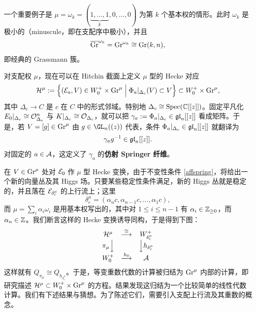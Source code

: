 一个重要例子是 $\mu=\omega_k=(\underbrace{1,\dots,1}_k,0,\dots,0)$ 为第 $k$ 个基本权的情形。此时 $\omega_k$ 是极小的（minuscule，即在支配序中极小），并且
\[
\overline{\textnormal{Gr}}^{\omega_k}=\textnormal{Gr}^{\omega_k}\cong \textnormal{Gr}(k,n),
\]
即经典的 Grassmann 簇。

对支配权 $\mu$，现在可以在 Hitchin 截面上定义 $\mu$ 型的 Hecke 对应
\begin{equation}\label{general}
\mathcal{H}^\mu:=\left\{ ({\mathcal E}_a,V)\in W^+_0\times \textnormal{Gr}^\mu \;\Big|\;  \Phi_a|_{\Delta_c}(V)\subset V\right\}\subset W^+_0\times  \textnormal{Gr}^\mu,
\end{equation}
其中 $\Delta_c\to C$ 是 $c$ 在 $C$ 中的形式邻域。特别地 $\Delta_c\cong \operatorname{Spec}(\mathbb{C}[[z]])$。固定平凡化 $E_0|_{\Delta_c}\cong {\mathcal O}^n_{\Delta_c}$ 与 $K|_{\Delta_c}\cong {\mathcal O}_{\Delta_c}$，就可以把 $\gamma_a:=\Phi_a|_{\Delta_c}\in {\mathfrak g\mathfrak l}_n[[z]]$ 看成矩阵。于是，若 $V=[g]\in \textnormal{Gr}^\mu$ 由 $g\in \GL_n((z))$ 代表，条件 $\Phi_a|_{\Delta_c}\in {\mathfrak g\mathfrak l}_n[[z]]$ 就翻译为
\begin{equation}\label{affspring}
\gamma_a g^{-1}\in {\mathfrak g\mathfrak l}_n[[z]].
\end{equation}
对固定的 $a\in {\mathcal{A}}$，这定义了 $\gamma_a$ 的\textbf{仿射 Springer 纤维}。

在 $V\in \textnormal{Gr}^\mu$ 处对 ${\mathcal E}_0$ 作 $\mu$ 型 Hecke 变换，由于不变性条件 \eqref{affspring}，将给出一个新的向量丛及其 Higgs 场。只要某些稳定性条件满足，新的 Higgs 丛就是稳定的，并且落在 ${\mathcal E}_{\delta^\mu_c}$ 的上行流上；这里
\begin{equation}\label{deltamuc}
\delta^\mu_c=(\alpha_n c,\alpha_{n-1} c,\dots,\alpha_{1} c),
\end{equation}
而 $\mu=\sum_{i} \alpha_i \omega_i$ 是用基本权写出的，其中对 $1\leq i \leq n-1$ 有 $\alpha_i\in \mathbb{Z}_{\geq 0}$，而 $\alpha_n\in \mathbb{Z}$。我们断言这样的 Hecke 变换诱导同构，于是得到下图：
\begin{equation}\label{diagram}
\begin{array}{ccc}
\mathcal{H}^\mu&\stackrel{\cong}{\longrightarrow}& W^+_{\delta^\mu_c}\\
\pi_\mu{\Big\downarrow} && {\Big\downarrow} h_{{\delta^\mu_c}} \\
W^+_0 &\stackrel{h_0}{\longrightarrow}& {\mathcal{A}}
\end{array}
\end{equation}
这样就有 $Q_{\pi_\mu}\cong Q_{h_{\delta^\mu_c}}$。于是，等变重数代数的计算被归结为 $\textnormal{Gr}^\mu$ 内部的计算，即研究描述 $\mathcal{H}^\mu\subset W^+_0 \times \textnormal{Gr}^\mu$ 的方程。结果发现这归结为一个比较简单的线性代数计算。我们有下述结果与猜想。为了陈述它们，需要引入支配上行流及其重数的概念。

